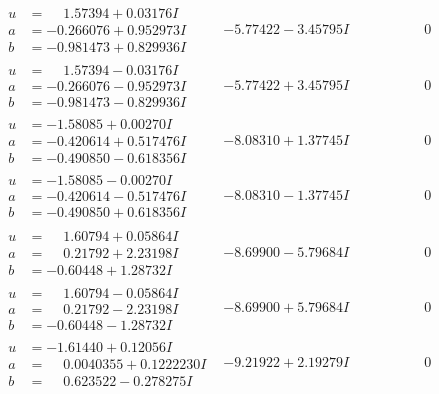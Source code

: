 \documentclass[1p]{elsarticle_modified}
\theoremstyle{definition}
\begin{document}
$$\begin{array}{c|c|c}
\begin{aligned}
u &= \phantom{-}1.57394 + 0.03176 I \\
a &= -0.266076 + 0.952973 I \\
b &= -0.981473 + 0.829936 I\end{aligned}
 & -5.77422 - 3.45795 I & \phantom{-0.000000 } 0 \\ \hline\begin{aligned}
u &= \phantom{-}1.57394 - 0.03176 I \\
a &= -0.266076 - 0.952973 I \\
b &= -0.981473 - 0.829936 I\end{aligned}
 & -5.77422 + 3.45795 I & \phantom{-0.000000 } 0 \\ \hline\begin{aligned}
u &= -1.58085 + 0.00270 I \\
a &= -0.420614 + 0.517476 I \\
b &= -0.490850 - 0.618356 I\end{aligned}
 & -8.08310 + 1.37745 I & \phantom{-0.000000 } 0 \\ \hline\begin{aligned}
u &= -1.58085 - 0.00270 I \\
a &= -0.420614 - 0.517476 I \\
b &= -0.490850 + 0.618356 I\end{aligned}
 & -8.08310 - 1.37745 I & \phantom{-0.000000 } 0 \\ \hline\begin{aligned}
u &= \phantom{-}1.60794 + 0.05864 I \\
a &= \phantom{-}0.21792 + 2.23198 I \\
b &= -0.60448 + 1.28732 I\end{aligned}
 & -8.69900 - 5.79684 I & \phantom{-0.000000 } 0 \\ \hline\begin{aligned}
u &= \phantom{-}1.60794 - 0.05864 I \\
a &= \phantom{-}0.21792 - 2.23198 I \\
b &= -0.60448 - 1.28732 I\end{aligned}
 & -8.69900 + 5.79684 I & \phantom{-0.000000 } 0 \\ \hline\begin{aligned}
u &= -1.61440 + 0.12056 I \\
a &= \phantom{-}0.0040355 + 0.1222230 I \\
b &= \phantom{-}0.623522 - 0.278275 I\end{aligned}
 & -9.21922 + 2.19279 I & \phantom{-0.000000 } 0 \\ \hline\begin{aligned}

\end{aligned}
\end{array}$$
\end{document}
